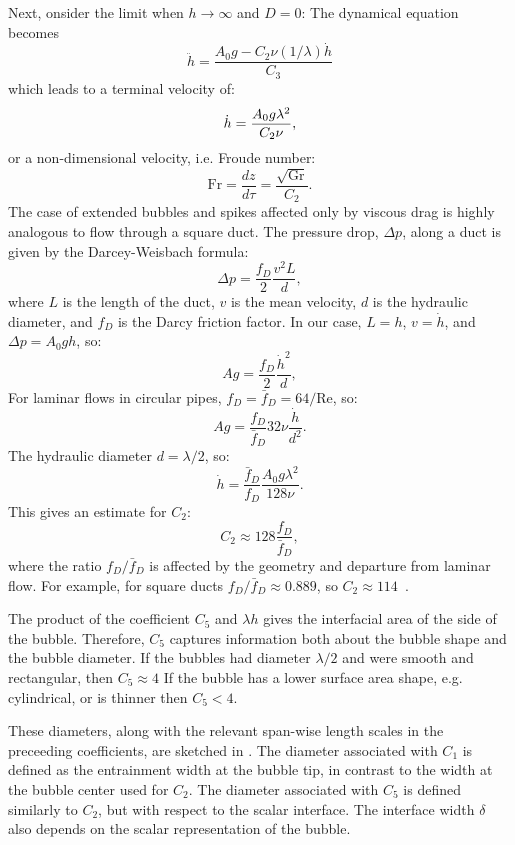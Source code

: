 Next, onsider the limit when $h \rightarrow \infty$ and $D = 0$:
The dynamical equation becomes
\begin{equation}
\ddot{h} = \frac{A_0 g - C_2 \nu (1/\lambda) \dot{h}}{C_3}
\end{equation}
which leads to a terminal velocity of:
\begin{equation} \elabel{visc_vel}
\dot{h} = \frac{A_0 g \lambda^2 }{C_2 \nu},
\end{equation}
or a non-dimensional velocity, i.e. Froude number:
\begin{equation}
\text{Fr} = \frac{d z}{d \tau} = \frac{\sqrt{\text{Gr}}}{C_2}.
\end{equation}
The case of extended bubbles and spikes affected only by viscous drag is highly analogous to flow through a square duct.
The pressure drop, $\Delta p$, along a duct is given by the Darcey-Weisbach formula:
\begin{equation}
\Delta p = \frac{f_D}{2} \frac{v^2 L}{d},
\end{equation}
where $L$ is the length of the duct,
$v$ is the mean velocity,
$d$ is the hydraulic diameter,
and $f_D$ is the Darcy friction factor.
In our case, $L = h$, $v = \dot{h}$, and $\Delta p = A_0 g h$, so:
\begin{equation}
A g = \frac{f_D}{2} \frac{\dot{h}^2}{d},
\end{equation}
For laminar flows in circular pipes, $f_D = \bar{f}_D = 64 / \text{Re}$, so:
\begin{equation}
A g = \frac{f_D}{\bar{f}_D} 32 \nu \frac{\dot{h}}{d^2}.
\end{equation}
The hydraulic diameter $d = \lambda / 2$, so:
\begin{equation}
\dot{h} = \frac{\bar{f}_D}{f_D} \frac{A_0 g \lambda^2}{128 \nu} .
\end{equation}
This gives an estimate for $C_2$:
\begin{equation}
C_2 \approx 128 \frac{f_D}{\bar{f}_D},
\end{equation}
where the ratio $f_D / \bar{f}_D$ is affected by the geometry and departure from laminar flow.
For example, for square ducts $f_D/\bar{f}_D \approx 0.889$, so $C_2 \approx 114$~\cite{ghiaasiaan2011convective}. 

The product of the coefficient $C_5$ and $\lambda h$ gives the interfacial area of the side of the bubble.
Therefore, $C_5$ captures information both about the bubble shape and the bubble diameter.
If the bubbles had diameter $\lambda / 2$ and were smooth and rectangular, then $C_5 \approx 4$
If the bubble has a lower surface area shape, e.g. cylindrical, or is thinner then $C_5 < 4$.

These diameters, along with the relevant span-wise length scales in the preceeding coefficients, are sketched in .
The diameter associated with $C_1$ is defined as the entrainment width at the bubble tip, in contrast to the width at the bubble center used for $C_2$.
The diameter associated with $C_5$ is defined similarly to $C_2$, but with respect to the scalar interface.
The interface width $\delta$ also depends on the scalar representation of the bubble.

